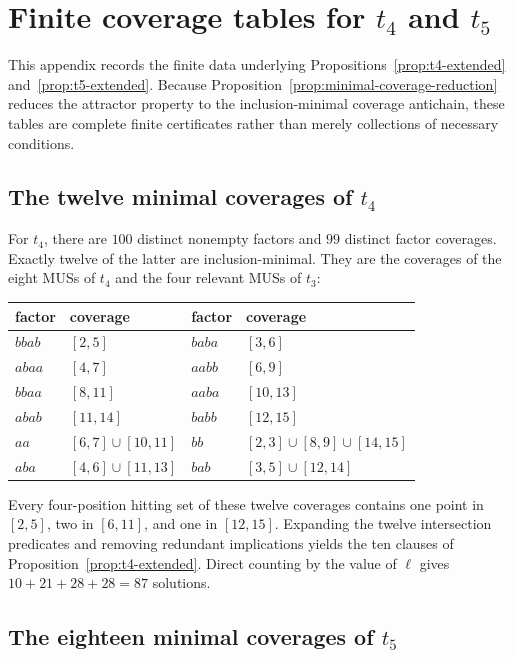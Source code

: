 
\appendix
\section{Finite coverage tables for \texorpdfstring{$t_4$ and $t_5$}{t4 and t5}}
\label{app:finite-tables}

This appendix records the finite data underlying Propositions~\ref{prop:t4-extended} and~\ref{prop:t5-extended}.  Because Proposition~\ref{prop:minimal-coverage-reduction} reduces the attractor property to the inclusion-minimal coverage antichain, these tables are complete finite certificates rather than merely collections of necessary conditions.

\subsection{The twelve minimal coverages of \texorpdfstring{$t_4$}{t4}}

For $t_4$, there are $100$ distinct nonempty factors and $99$ distinct factor coverages.  Exactly twelve of the latter are inclusion-minimal.  They are the coverages of the eight MUSs of $t_4$ and the four relevant MUSs of $t_3$:

\begin{center}
\begin{tabular}{ll@{\qquad}ll}
\toprule
factor & coverage & factor & coverage\\
\midrule
$bbab$ & $[2,5]$ & $baba$ & $[3,6]$\\
$abaa$ & $[4,7]$ & $aabb$ & $[6,9]$\\
$bbaa$ & $[8,11]$ & $aaba$ & $[10,13]$\\
$abab$ & $[11,14]$ & $babb$ & $[12,15]$\\
$aa$ & $[6,7]\cup[10,11]$ & $bb$ & $[2,3]\cup[8,9]\cup[14,15]$\\
$aba$ & $[4,6]\cup[11,13]$ & $bab$ & $[3,5]\cup[12,14]$\\
\bottomrule
\end{tabular}
\end{center}

Every four-position hitting set of these twelve coverages contains one point in $[2,5]$, two in $[6,11]$, and one in $[12,15]$.  Expanding the twelve intersection predicates and removing redundant implications yields the ten clauses of Proposition~\ref{prop:t4-extended}.  Direct counting by the value of $\ell$ gives $10+21+28+28=87$ solutions.

\subsection{The eighteen minimal coverages of \texorpdfstring{$t_5$}{t5}}

